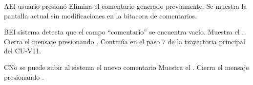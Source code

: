 \begin{UCtrayectoriaA}{A}{El usuario presionó }
  \hypertarget{SP2-CU11-A}{}
	\UCpaso Elimina el comentario generado previamente.
  \UCpaso Se muestra la pantalla actual sin modificaciones en la bitacora de comentarios.
\end{UCtrayectoriaA}

\begin{UCtrayectoriaA}{B}{El sistema detecta que el campo “comentario” se encuentra vacío.} 
  \hypertarget{SP2-CU11-B}{}
	\UCpaso Muestra el .
    \UCpaso[\UCactor] Cierra el mensaje presionando .
    \UCpaso Continúa en el paso 7 de la trayectoria principal del CU-V11.
\end{UCtrayectoriaA}

\begin{UCtrayectoriaA}{C}{No se puede subir al sistema el nuevo comentario} 
  \hypertarget{SP2-CU11-C}{}
  \UCpaso Muestra el .
  \UCpaso[\UCactor] Cierra el mensaje presionando .
\end{UCtrayectoriaA}